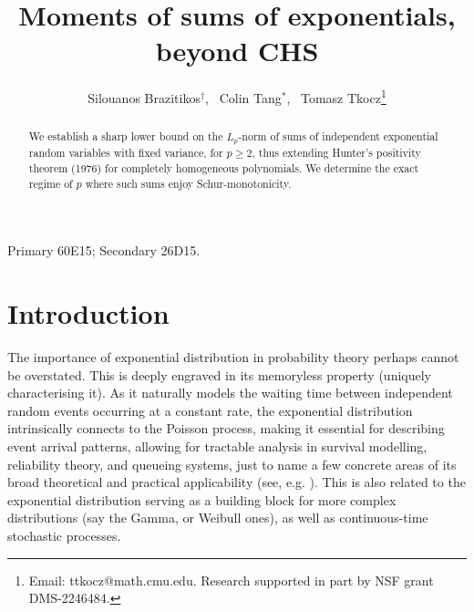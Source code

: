 \documentclass[10pt]{article}
\title{\vspace{-3em}
Moments of sums of exponentials, beyond CHS
}
\author{Silouanos Brazitikos$^\dagger$, \ Colin Tang$^*$, \
Tomasz Tkocz\footnote{Email: ttkocz@math.cmu.edu. Research supported in part by NSF grant DMS-2246484.}
}
\date{\begin{normalsize}
\emph{$^\dagger$Department of Mathematics and Applied Mathematics, University of Crete, 70013 Heraklion - Crete, Greece.} \\\vspace*{0.7em}
\emph{$^*$Department of Mathematical Sciences, Carnegie Mellon University, Pittsburgh, PA 15213, USA}
\end{normalsize}}
\newcommand{\1}{\textbf{1}}
\theoremstyle{remark}
\theoremstyle{definition}
\begin{document}
\maketitle

\begin{abstract}
We establish a sharp lower bound on the $L_p$-norm of sums of independent exponential random variables with fixed variance, for $p \geq 2$, thus extending Hunter's positivity theorem (1976) for completely homogeneous polynomials. We determine the exact regime of $p$ where such sums enjoy Schur-monotonicity.
\end{abstract}

\bigskip

\begin{footnotesize}
 Primary 60E15; Secondary 26D15.

\end{footnotesize}

\bigskip



\section{Introduction}


The importance of exponential distribution in probability theory perhaps cannot be overstated. This is deeply engraved in its memoryless property (uniquely characterising it). As it naturally models the waiting time between independent random events occurring at a constant rate, the exponential distribution intrinsically connects to the Poisson process, making it essential for describing event arrival patterns, allowing for tractable analysis in survival modelling, reliability theory, and queueing systems, just to name a few concrete areas of its broad theoretical and practical applicability (see, e.g. \cite{Bal, King}). This is also related to the exponential distribution serving  as a building block for more complex distributions (say the Gamma, or Weibull ones), as well as continuous-time stochastic processes.
\end{document}
